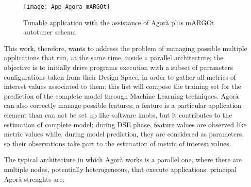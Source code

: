 \begin{figure}[H]

    \centering
    \texttt{[image: App\_Agora\_mARGOt]}
    \caption{Tunable application with the assistance of Agorà plus mARGOt autotuner schema}
    \label{fig::appAGORA}
    
\end{figure}

This work, therefore, wants to address the problem of managing possible multiple applications that run, at the same time, inside a parallel architecture; the objective is to initially drive programs execution with a subset of parameters configurations taken from their Design Space, in order to gather all metrics of interest values associated to them; this list will compose the training set for the prediction of the complete model through Machine Learning techniques. Agorà can also correctly manage possible features; a feature is a particular application element than can not be set up like software knobs, but it contributes to the estimation of complete model; during DSE phase, feature values are observed like metric values while, during model prediction, they are considered as parameters, so their observations take part to the estimation of metric of interest values.

The typical architecture in which Agorà works is a parallel one, where there are multiple nodes, potentially heterogeneous, that execute applications; principal Agorà strenghts are:

